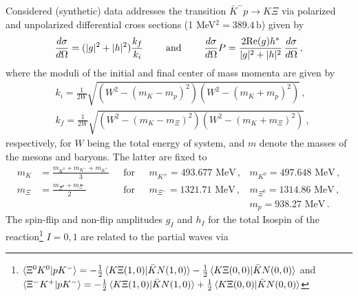 \documentclass[aps, prd, twocolumn, showpacs, superscriptaddress,
preprintnumbers, nofootinbib]{revtex4-1}
\begin{document}
\appendix
Considered (synthetic) data addresses the transition $\bar K^-p\to K\Xi$ via polarized and unpolarized differential cross sections 
(1 MeV$^2=389.4\,\text{b}$) given by
\begin{align}
\frac{d\sigma}{d\Omega}=(|g|^2+|h|^2) \frac{k_f}{k_i}
\qquad\text{ and }\qquad
\frac{d\sigma}{d\Omega}P=\frac{2 \space \text{Re}(g)h^{*}}{|g|^2+|h|^2} \, \frac{d\sigma}{d\Omega}\,,
\end{align}
where the moduli of the initial and final center of mass momenta are given by 
\begin{eqnarray}
&k_i=\frac{1}{2W}\sqrt{(W^2-(m_K-m_p)^2)(W^2-(m_K+m_p)^2)}\,,\\
&k_f=\frac{1}{2W}\sqrt{(W^2-(m_K-m_{\Xi})^2)(W^2-(m_K+m_{\Xi})^2)}\,,
\end{eqnarray}
respectively, for $W$ being the total energy of system, and $m$ denote the masses of the mesons and baryons. The latter are fixed to
\begin{align*}
m_{K}&=\frac{m_{K^{0}}+m_{K^{-}}+m_{K^{+}}}{3}
&\text{~~for~~}
&m_{K^{\pm}}=493.677 \text{ MeV}\,,
&m_{K^{0}}=497.648 \text{ MeV}\,,
\\
m_{\Xi}&=\frac{m_{\Xi^{0}}+m_{\Xi^{-}}}{2}
&\text{~~for~~}
&m_{\Xi^{-}}=1321.71 \text{ MeV}\,,
&m_{\Xi^{0}}=1314.86 \text{ MeV}\,,\\
&&~
&&m_p=938.27 \text{ MeV}\,.
\end{align*}
The spin-flip and non-flip amplitudes $g_I$ and $h_I$ for the total Isospin of the reaction\footnote{$\braket{\Xi^0 K^0 | p K^-}= - \frac{1}{2}\braket{K\Xi(1,0)|\bar KN (1,0)}- \frac{1}{2}\braket{K\Xi(0,0)|\bar KN (0,0)}$ and 
{$\braket{\Xi^- K^+ | p K^-}= - \frac{1}{2}\braket{K\Xi(1,0)|\bar KN (1,0)}+ \frac{1}{2}\braket{K\Xi(0,0)|\bar KN (0,0)}$}} $I=0,1$ are related to the partial waves via
\end{document}
